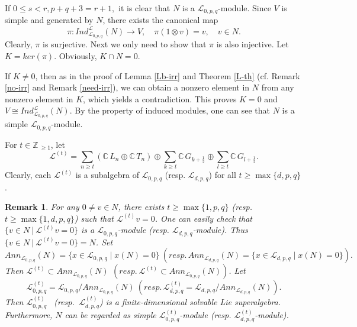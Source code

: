 \documentclass[12pt]{article}
\def\ssc{\scriptscriptstyle}
\def\Z{\mathbb{Z}{\ssc\,}}
\def\C{\mathbb{C}{\ssc\,}}
\numberwithin{equation}{section}
\newtheorem{rema}[theo]{Remark}
\begin{document}
 If   $0\le s<r, p+q+3=r+1,$ it is clear that $N$ is a  $\mathcal{L}_{0,p,q}$-module. Since  $V$ is simple and generated by $N$, there exists  the canonical map
 $$\pi: Ind^{\mathcal{L}}_{\mathcal{L}_{0,p,q}}(N)\rightarrow V,\quad \pi(1\otimes v)= v,\quad v\in N.$$
Clearly, $\pi$ is surjective.  Next we only need to show that $\pi$ is also injective.  Let $K=ker(\pi)$. Obviously, $K\cap N=0$.



If $K\ne 0$, then as in
the proof of Lemma \ref{Lb-irr} and Theorem \ref{L-th} (cf. Remark \ref{no-irr} and Remark \ref{need-irr}), we can obtain  a nonzero element in $N$ from any nonzero element in $K$, which yields a contradiction. This proves $K=0$ and $V\cong Ind^{\mathcal{L}}_{\mathcal{L}_{0,p,q}}(N).$ By the property of induced modules, one can see that $N$ is a simple $\mathcal{L}_{0,p,q}$-module.







For $t\in\Z_{\ge 1}$, let $$\mathcal{L}^{(t)}=\sum\limits_{n\ge t}(\C L_n \oplus \C T_n) \oplus \sum\limits_{k\ge t}
\C G_{k+\frac{1}{2}}\oplus \sum\limits_{l\ge t}\C G_{l+\frac{1}{2}}.$$
Clearly,  each $\mathcal{L}^{(t)}$ is a  subalgebra of $\mathcal{L}_{0,p,q}$ (resp. $\mathcal{L}_{d,p,q}$) for all $t\ge \max\{d,p,q\}$.

\begin{rema} For any $0\ne v\in N$, there exists $t\ge \max\{1,p,q\}$ (resp. $t\ge \max\{1,d,p,q\}$) such that $\mathcal{L}^{(t)}v=0$.  One can easily check that $\{v\in N~|~\mathcal{L}^{(t)}v=0\}$  is a $\mathcal{L}_{0,p,q}$-module (resp. $\mathcal{L}_{d,p,q}$-module).
Thus $\{v\in N~|~\mathcal{L}^{(t)}v=0\}=N$. Set $$Ann_{\mathcal{L}_{0,p,q}}(N)=\{x\in \mathcal{L}_{0,p,q}\mid x(N)=0\}\  (resp.\, Ann_{\mathcal{L}_{d,p,q}}(N)=\{x\in \mathcal{L}_{d,p,q}\mid x(N)=0\}).$$ Then $\mathcal{L}^{(t)}\subset Ann_{\mathcal{L}_{0,p,q}}(N)\ \,(resp.\ \mathcal{L}^{(t)}\subset Ann_{\mathcal{L}_{0,p,q}}(N))$. Let
$$\mathcal{L}_{0,p,q}^{(t)}= \mathcal{L}_{0,p,q}/Ann_{\mathcal{L}_{0,p,q}}(N)\ (resp. \,\mathcal{L}_{d,p,q}^{(t)}= \mathcal{L}_{d,p,q}/Ann_{\mathcal{L}_{d,p,q}}(N)).$$ Then
 $\mathcal{L}_{0,p,q}^{(t)}$ \ (resp. \,$\mathcal{L}_{d,p,q}^{(t)}$) is a finite-dimensional solvable Lie superalgebra. Furthermore,
$N$ can be regarded as simple $\mathcal{L}_{0,p,q}^{(t)}$-module (resp. $\mathcal{L}_{d,p,q}^{(t)}$-module).
\end{rema}
\end{document}
